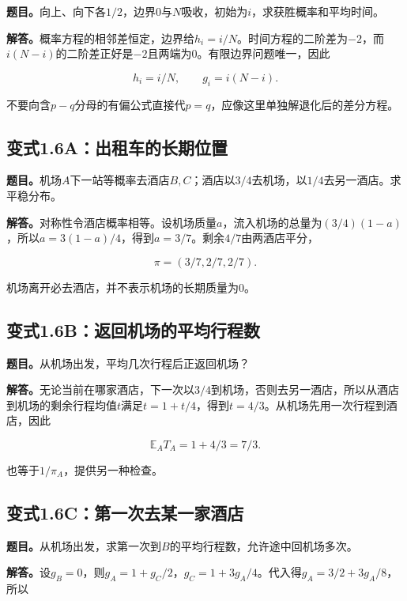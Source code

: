 \documentclass[
  11pt,a4paper,UTF8,fontset=fandol]{ctexart}
\begin{document}
\textbf{题目。}向上、向下各\(1/2\)，边界0与\(N\)吸收，初始为\(i\)，求获胜概率和平均时间。

\textbf{解答。}概率方程的相邻差恒定，边界给\(h_i=i/N\)。时间方程的二阶差为\(-2\)，而\(i(N-i)\)的二阶差正好是\(-2\)且两端为0。有限边界问题唯一，因此

\[\boxed{h_i=i/N,\qquad g_i=i(N-i).}\]

不要向含\(p-q\)分母的有偏公式直接代\(p=q\)，应像这里单独解退化后的差分方程。

\subsection{变式1.6A：出租车的长期位置}\label{ux53d8ux5f0f1.6aux51faux79dfux8f66ux7684ux957fux671fux4f4dux7f6e}

\textbf{题目。}机场\(A\)下一站等概率去酒店\(B,C\)；酒店以\(3/4\)去机场，以\(1/4\)去另一酒店。求平稳分布。

\textbf{解答。}对称性令酒店概率相等。设机场质量\(a\)，流入机场的总量为\((3/4)(1-a)\)，所以\(a=3(1-a)/4\)，得到\(a=3/7\)。剩余\(4/7\)由两酒店平分，

\[\boxed{\pi=(3/7,2/7,2/7).}\]

机场离开必去酒店，并不表示机场的长期质量为0。

\subsection{变式1.6B：返回机场的平均行程数}\label{ux53d8ux5f0f1.6bux8fd4ux56deux673aux573aux7684ux5e73ux5747ux884cux7a0bux6570}

\textbf{题目。}从机场出发，平均几次行程后正返回机场？

\textbf{解答。}无论当前在哪家酒店，下一次以\(3/4\)到机场，否则去另一酒店，所以从酒店到机场的剩余行程均值\(t\)满足\(t=1+t/4\)，得到\(t=4/3\)。从机场先用一次行程到酒店，因此

\[\boxed{\mathbb E_AT_A=1+4/3=7/3.}\]

也等于\(1/\pi_A\)，提供另一种检查。

\subsection{变式1.6C：第一次去某一家酒店}\label{ux53d8ux5f0f1.6cux7b2cux4e00ux6b21ux53bbux67d0ux4e00ux5bb6ux9152ux5e97}

\textbf{题目。}从机场出发，求第一次到\(B\)的平均行程数，允许途中回机场多次。

\textbf{解答。}设\(g_B=0\)，则\(g_A=1+g_C/2\)，\(g_C=1+3g_A/4\)。代入得\(g_A=3/2+3g_A/8\)，所以
\end{document}

